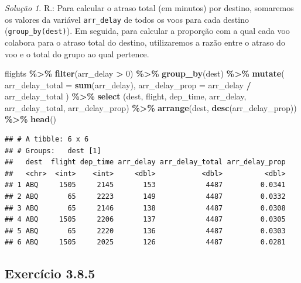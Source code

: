 \documentclass[
]{latex/krantz}
\newenvironment{Shaded}{\begin{snugshade}}{\end{snugshade}}
\newcommand{\AttributeTok}[1]{\textcolor[rgb]{0.13,0.29,0.53}{#1}}
\newcommand{\DecValTok}[1]{\textcolor[rgb]{0.00,0.00,0.81}{#1}}
\newcommand{\FunctionTok}[1]{\textcolor[rgb]{0.13,0.29,0.53}{\textbf{#1}}}
\newcommand{\NormalTok}[1]{#1}
\newcommand{\SpecialCharTok}[1]{\textcolor[rgb]{0.81,0.36,0.00}{\textbf{#1}}}
\theoremstyle{definition}
\theoremstyle{definition}
\theoremstyle{definition}
\theoremstyle{definition}
\theoremstyle{remark}
\newtheorem*{solution}{Solução}
\begin{document}
\begin{solution}

R.: Para calcular o atraso total (em minutos) por destino, somaremos os valores da variável \texttt{arr\_delay} de todos os voos para cada destino (\texttt{group\_by(dest)}). Em seguida, para calcular a proporção com a qual cada voo colabora para o atraso total do destino, utilizaremos a razão entre o atraso do voo e o total do grupo ao qual pertence.

\begin{Shaded}
\begin{Highlighting}[]
\NormalTok{flights }\SpecialCharTok{\%\textgreater{}\%}
    \FunctionTok{filter}\NormalTok{(arr\_delay }\SpecialCharTok{\textgreater{}} \DecValTok{0}\NormalTok{) }\SpecialCharTok{\%\textgreater{}\%}
    \FunctionTok{group\_by}\NormalTok{(dest) }\SpecialCharTok{\%\textgreater{}\%}
    \FunctionTok{mutate}\NormalTok{(}
        \AttributeTok{arr\_delay\_total =} \FunctionTok{sum}\NormalTok{(arr\_delay),}
        \AttributeTok{arr\_delay\_prop =}\NormalTok{ arr\_delay }\SpecialCharTok{/}\NormalTok{ arr\_delay\_total}
\NormalTok{    ) }\SpecialCharTok{\%\textgreater{}\%}
    \FunctionTok{select}\NormalTok{ (dest, flight, dep\_time, arr\_delay, arr\_delay\_total, arr\_delay\_prop) }\SpecialCharTok{\%\textgreater{}\%}
    \FunctionTok{arrange}\NormalTok{(dest, }\FunctionTok{desc}\NormalTok{(arr\_delay\_prop)) }\SpecialCharTok{\%\textgreater{}\%}
    \FunctionTok{head}\NormalTok{()}
\end{Highlighting}
\end{Shaded}

\begin{verbatim}
## # A tibble: 6 x 6
## # Groups:   dest [1]
##   dest  flight dep_time arr_delay arr_delay_total arr_delay_prop
##   <chr>  <int>    <int>     <dbl>           <dbl>          <dbl>
## 1 ABQ     1505     2145       153            4487         0.0341
## 2 ABQ       65     2223       149            4487         0.0332
## 3 ABQ       65     2146       138            4487         0.0308
## 4 ABQ     1505     2206       137            4487         0.0305
## 5 ABQ       65     2220       136            4487         0.0303
## 6 ABQ     1505     2025       126            4487         0.0281
\end{verbatim}

\end{solution}

\hypertarget{exr3-8-5}{%
\subsection*{Exercício 3.8.5}\label{exr3-8-5}}
\end{document}
